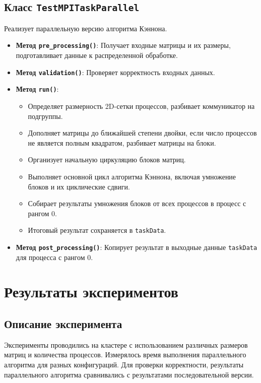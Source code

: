 \documentclass[12pt]{article}
\begin{document}
\subsection{Класс \texttt{TestMPITaskParallel}}
Реализует параллельную версию алгоритма Кэннона.
\begin{itemize}
    \item \textbf{Метод \texttt{pre\_processing()}}: Получает входные матрицы и их размеры, подготавливает данные к распределенной обработке.
    \item \textbf{Метод \texttt{validation()}}: Проверяет корректность входных данных.
    \item \textbf{Метод \texttt{run()}}:
     \begin{itemize}
        \item Определяет размерность 2D-сетки процессов, разбивает коммуникатор на подгруппы.
        \item Дополняет матрицы до ближайшей степени двойки, если число процессов не является полным квадратом, разбивает матрицы на блоки.
        \item Организует начальную циркуляцию блоков матриц.
        \item Выполняет основной цикл алгоритма Кэннона, включая умножение блоков и их циклические сдвиги.
        \item Собирает результаты умножения блоков от всех процессов в процесс с рангом 0.
        \item Итоговый результат сохраняется в \texttt{taskData}.
    \end{itemize}
    \item \textbf{Метод \texttt{post\_processing()}}: Копирует результат в выходные данные \texttt{taskData} для процесса с рангом 0.
\end{itemize}

\section{Результаты экспериментов}

\subsection{Описание эксперимента}

Эксперименты проводились на кластере с использованием различных размеров матриц и количества процессов. Измерялось время выполнения параллельного алгоритма для разных конфигураций. Для проверки корректности, результаты параллельного алгоритма сравнивались с результатами последовательной версии.
\end{document}
